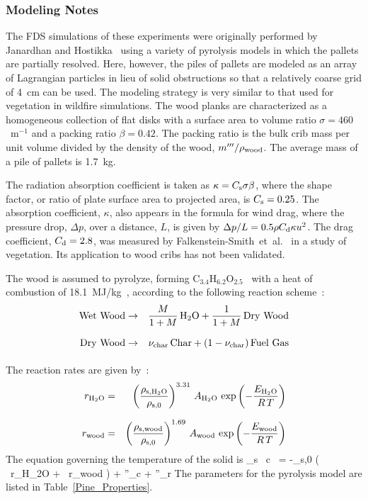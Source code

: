 \subsubsection{Modeling Notes}

The FDS simulations of these experiments were originally performed by Janardhan and Hostikka~\cite{Janardhan:FT2019,Janardhan:FSJ2021} using a variety of pyrolysis models in which the pallets are partially resolved. Here, however, the piles of pallets are modeled as an array of Lagrangian particles in lieu of solid obstructions so that a relatively coarse grid of 4~cm can be used. The modeling strategy is very similar to that used for vegetation in wildfire simulations. The wood planks are characterized as a homogeneous collection of flat disks with a surface area to volume ratio $\sigma=460$~m$^{-1}$ and a packing ratio $\beta=0.42$. The packing ratio is the bulk crib mass per unit volume divided by the density of the wood, $m'''/\rho_{\rm wood}$. The average mass of a pile of pallets is 1.7~kg.

The radiation absorption coefficient is taken as $\kappa=C_{\rm s} \sigma \beta$, where the shape factor, or ratio of plate surface area to projected area, is $C_{\rm s}=0.25$. The absorption coefficient, $\kappa$, also appears in the formula for wind drag, where the pressure drop, $\Delta p$, over a distance, $L$, is given by $\Delta p / L = 0.5 \rho C_{\rm d} \kappa u^2$. The drag coefficient, $C_{\rm d}=2.8$, was measured by Falkenstein-Smith~et~al.~\cite{Falkenstein-Smith:2018} in a study of vegetation. Its application to wood cribs has not been validated.

The wood is assumed to pyrolyze, forming C$_{3.4}$H$_{6.2}$O$_{2.5}$~\cite{Ritchie:1} with a heat of combustion of 18.1~MJ/kg~\cite{Hansen:2010}, according to the following reaction scheme~\cite{Janardhan:FSJ2021}:
\begin{eqnarray}
 {\rm Wet\ Wood} & \rightarrow & \frac{M}{1+M} \, {\rm H_2O} + \frac{1}{1+M} \, {\rm Dry\ Wood} \\[.1in]
 {\rm Dry\ Wood} & \rightarrow & \nu_{\rm char} \, {\rm Char} + (1-\nu_{\rm char}) \, {\rm Fuel\ Gas} \\[.1in]
\end{eqnarray}
The reaction rates are given by~\cite{Janardhan:FSJ2021}:
\begin{eqnarray}
  r_{\rm H_2O} &=& \left( \frac{\rho_{\rm s,H_2O}}{\rho_{\rm s,0}} \right)^{3.31} \, A_{\rm H_2O} \, \exp \left( -\frac{E_{\rm H_2O}}{R \, T} \right)  \\[.1in]
  r_{\rm wood} &=& \left( \frac{\rho_{\rm s,wood}}{\rho_{\rm s,0}} \right)^{1.69} \, A_{\rm wood} \, \exp \left( -\frac{E_{\rm wood}}{R \, T} \right)
\end{eqnarray}
The equation governing the temperature of the solid is
\be
\rho_{\rm s} \, c \,  = -\rho_{\rm s,0} \left( \ r_{\rm H_2O} + \ r_{\rm wood} \right) + \nabla {}''_{\rm c}  +  \nabla {}''_{\rm r}
\ee
The parameters for the pyrolysis model are listed in Table~\ref{Pine_Properties}.

